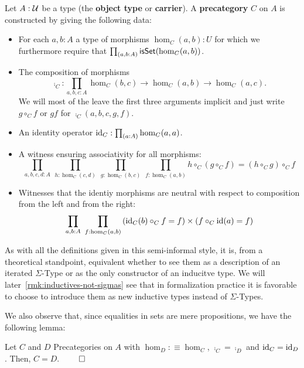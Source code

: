 \begin{defn}[Precategory] \label{def:hott-precat}
Let $A : \mathcal{U}$ be a type (the \textbf{object type} or \textbf{carrier}). A
\textbf{precategory} $C$ on $A$ is constructed by giving the following data:
\begin{itemize}
\item For each $a, b : A$ a type of morphisms $\hom_C(a, b) : U$ for which we furthermore
require that $\prod_{(a,b:A)} \mathsf{isSet}(\hom_C(a, b))$.
\item The composition of morphisms
\begin{equation*}
\comp_C : \prod_{a,b,c:A} \hom_C(b, c) \to \hom_C(a, b) \to \hom_C(a, c) \text{.}
\end{equation*}
We will most of the leave the first three arguments implicit and just write
$g \circ_C f$ or $gf$ for $\comp_C(a,b,c,g,f)$.
\item An identity operator $\operatorname{id}_C : \prod_{(a:A)} \hom_C(a,a)$.
\item A witness ensuring associativity for all morphisms:
\begin{equation*}
\prod_{a,b,c,d:A} ~ \prod_{h:\hom_C(c,d)} ~ \prod_{g:\hom_C(b,c)} ~ \prod_{f:\hom_C(a,b)}
h \circ_C (g \circ_C f) = (h \circ_C g) \circ_C f
\end{equation*}
\item Witnesses that the identiy morphisms are neutral with respect to composition
from the left and from the right:
\begin{equation*}
\prod_{a, b : A} ~ \prod_{f : \hom_C(a, b)}
\left(\operatorname{id}_C(b) \circ_C f = f\right) \times \left(f \circ_C \operatorname{id}(a) = f\right)
\end{equation*}
\end{itemize}
\end{defn}

As with all the definitions given in this semi-informal style, it is, from a
theoretical standpoint, equivalent whether to see them as a description of an
iterated $\Sigma$-Type or as the only constructor of an inducitve type.
We will later~\ref{rmk:inductives-not-sigmas} see that in formalization practice
it is favorable to choose to introduce them as new inductive types instead of
$\Sigma$-Types.

We also observe that, since equalities in sets are mere propositions, we have the
following lemma:
\begin{lemma} \label{thm:hott-eq-precat}
Let $C$ and $D$ Precategories on $A$ with $\hom_D :\equiv \hom_C$, 
$\comp_C = \comp_D$ and $\operatorname{id}_C = \operatorname{id}_D$.
Then, $C = D$. \hfill $\qed$
\end{lemma}


